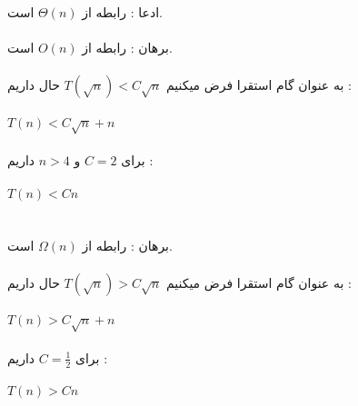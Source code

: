 \subproblem{}
ادعا : رابطه از $\Theta(n)$ است.\\\\
برهان : رابطه از $O(n)$ است. \\\\
به عنوان گام استقرا فرض میکنیم $T(\sqrt{n}) < C\sqrt{n}$ حال داریم : \\\\
$T(n) < C\sqrt{n} + n$\\\\
برای $C=2$ و $n>4$ داریم : \\\\
$T(n) < Cn$\\\\\\

برهان : رابطه از $\Omega(n)$ است. \\\\
به عنوان گام استقرا فرض میکنیم $T(\sqrt{n}) > C\sqrt{n}$ حال داریم : \\\\
$T(n) > C\sqrt{n} + n$\\\\
برای $C=\frac{1}{2}$ داریم : \\\\
$T(n) > Cn$\\\\\\